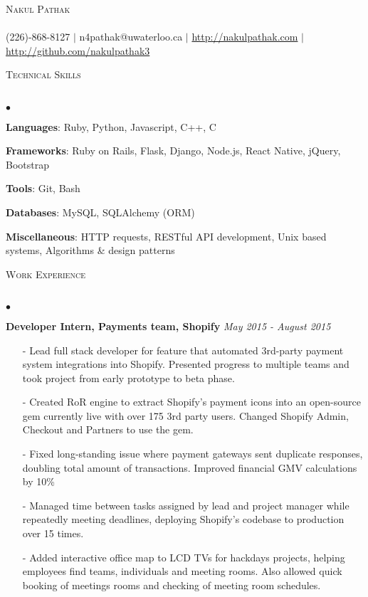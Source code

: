 \documentclass[10pt]{article}
\newcommand{\lineunder}{\vspace*{-8pt} \\ \hspace*{-18pt} \hrulefill \\}
\newcommand{\header}[1]{{\hspace*{-15pt}\vspace*{6pt} \textsc{#1}} \vspace*{-6pt} \lineunder}
\newenvironment{achievements}{\begin{list}{$\bullet$}{\topsep 0pt \itemsep -1.5pt \leftmargin 5pt}}{\vspace*{4pt}\end{list}}
\begin{document}
\small
\smallskip
\vspace*{-45pt}

\begin{center}
	{\Huge \scshape {Nakul Pathak}} \\
\hspace*{-18pt} \hrulefill \\
\vspace{2pt}
\hspace*{-18pt} (226)-868-8127 $|$ n4pathak@uwaterloo.ca $|$ \url{http://nakulpathak.com} $|$  \url{http://github.com/nakulpathak3}
\vspace{-5pt}
\end{center}

\vspace{7pt}

\header{\normalsize Technical Skills}
\begin{achievements}
\item \textbf{Languages}: Ruby, Python, Javascript, C++, C
\item \textbf{Frameworks}: Ruby on Rails, Flask, Django, Node.js, React Native, jQuery, Bootstrap
\item \textbf{Tools}: Git, Bash
\item \textbf{Databases}: MySQL,  SQLAlchemy (ORM)
\item \textbf{Miscellaneous}: HTTP requests, RESTful API development, Unix based systems, Algorithms \& design patterns
\end{achievements}

\vspace{6pt}

\header{\normalsize Work Experience}
\begin{achievements}
\item \textbf{Developer Intern, Payments team, Shopify} \hfill \textit {May 2015 - August 2015}
\begin{itemize}[leftmargin=0cm]
\item[-]Lead full stack developer for feature that automated 3rd-party payment system integrations into Shopify. Presented progress to multiple teams and took project from early prototype to beta phase.
\item[-]Created RoR engine to extract Shopify's payment icons into an open-source gem currently live with over 175 3rd party users. Changed Shopify Admin, Checkout and Partners to use the gem.
\item[-]Fixed long-standing issue where payment gateways sent duplicate responses, doubling total amount of transactions. Improved financial GMV calculations by 10\%
\item[-]Managed time between tasks assigned by lead and project manager while repeatedly meeting deadlines, deploying Shopify's codebase to production over 15 times.
\item[-]Added interactive office map to LCD TVs for hackdays projects, helping employees find teams, individuals and meeting rooms. Also allowed quick booking of meetings rooms and checking of meeting room schedules.
\end{itemize}
\end{achievements}
\end{document}
